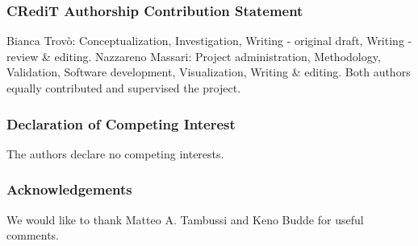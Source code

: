 \documentclass[runningheads]{llncs}
\begin{document}
\subsubsection{CRediT Authorship Contribution Statement}
 Bianca Trovò: Conceptualization, Investigation, Writing - original draft, Writing - review \& editing. Nazzareno Massari: Project administration, Methodology, Validation, Software development, Visualization, Writing \& editing. Both authors equally contributed and supervised the project.

\subsubsection{Declaration of Competing Interest}
The authors declare no competing interests.

\subsubsection{Acknowledgements} We would like to thank Matteo A. Tambussi and Keno Budde for useful comments.


%
%


\end{document}

